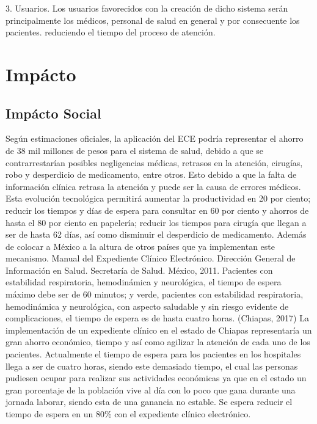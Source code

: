 3. Usuarios. Los usuarios favorecidos con la creación de dicho sistema serán principalmente los médicos, personal de salud en general y por consecuente los pacientes. reduciendo el tiempo del proceso de atención.


\section{Impácto}

\subsection{Impácto Social}

Según estimaciones oficiales, la aplicación del ECE podría representar el ahorro de 38 mil millones de pesos para el sistema de salud, debido a que se contrarrestarían posibles negligencias médicas, retrasos en la atención, cirugías, robo y desperdicio de medicamento, entre otros. Esto debido a que la falta de información clínica retrasa la atención y puede ser la causa de errores médicos. Esta evolución tecnológica permitirá aumentar la productividad en 20 por ciento; reducir los tiempos y días de espera para consultar en 60 por ciento y ahorros de hasta el 80 por ciento en papelería; reducir los tiempos para cirugía que llegan a ser de hasta 62 días, así como disminuir el desperdicio de medicamento. Además de colocar a México a la altura de otros países que ya implementan este mecanismo. Manual del Expediente Clínico Electrónico. Dirección General de Información en Salud. Secretaría de Salud. México, 2011.
Pacientes con estabilidad respiratoria, hemodinámica y neurológica, el tiempo de espera máximo debe ser de 60 minutos; y verde, pacientes con estabilidad respiratoria, hemodinámica y neurológica, con aspecto saludable y sin riesgo evidente de complicaciones, el tiempo de espera es de hasta cuatro horas. (Chiapas, 2017)
La implementación de un expediente clínico en el estado de Chiapas representaría un gran ahorro económico, tiempo y así como agilizar la atención de cada uno de los pacientes. Actualmente el tiempo de espera para los pacientes en los hospitales llega a ser de cuatro horas, siendo este demasiado tiempo, el cual las personas pudiesen ocupar para realizar sus actividades económicas ya que en el estado un gran porcentaje de la población vive al día con lo poco que gana durante una jornada laborar, siendo esta de una ganancia no estable. Se espera reducir el tiempo de espera en un 80\% con el expediente clínico electrónico.

